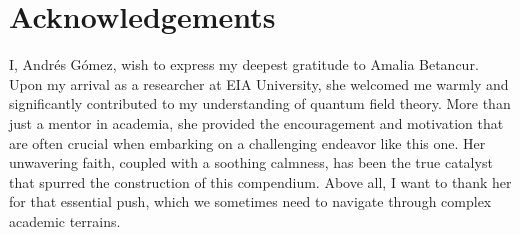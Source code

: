 \chapter{Acknowledgements}

\kant[2] %
I, Andrés Gómez, wish to express my deepest gratitude to Amalia Betancur. Upon my arrival as a researcher at EIA University, she welcomed me warmly and significantly contributed to my understanding of quantum field theory. More than just a mentor in academia, she provided the encouragement and motivation that are often crucial when embarking on a challenging endeavor like this one. Her unwavering faith, coupled with a soothing calmness, has been the true catalyst that spurred the construction of this compendium. Above all, I want to thank her for that essential push, which we sometimes need to navigate through complex academic terrains.
